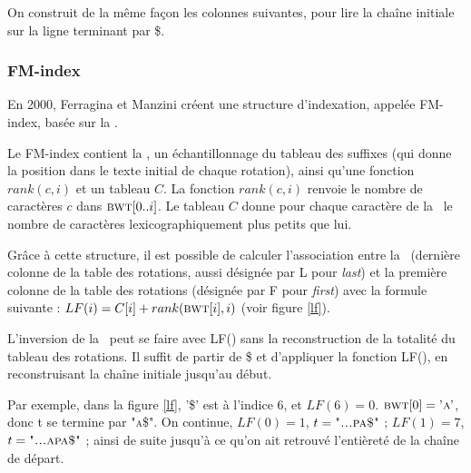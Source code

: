 On construit de la même façon les colonnes suivantes, pour lire la chaîne initiale sur la ligne terminant par \$.

\subsubsection{FM-index}

En 2000, Ferragina et Manzini créent une structure d'indexation, appelée FM-index, basée sur la \bwt.

Le FM-index contient la \bwt, un échantillonnage du tableau des suffixes (qui donne la position dans le texte initial de chaque rotation), ainsi qu'une fonction $rank(c, i)$  et un tableau $C$.
La fonction $rank(c, i)$ renvoie  le nombre de caractères $c$ dans $\textsc{bwt}[0..i]$. Le tableau $C$ donne pour chaque caractère de la \bwt\ le nombre de caractères lexicographiquement plus petits que lui.

Grâce à cette structure, il est possible de calculer l'association entre la \bwt\ (dernière colonne de la table des rotations, aussi désignée par L pour \textit{last}) et la première colonne de la table des rotations (désignée par F pour \textit{first}) avec la formule suivante : $LF(i) = C[i] + rank(\textsc{bwt}[i], i)$ (voir figure \ref{lf}).

L'inversion de la \bwt\ peut se faire avec LF() sans la reconstruction de la totalité du tableau des rotations. 
Il suffit de partir de \$ et d'appliquer la fonction LF(), en reconstruisant la chaîne initiale jusqu'au début.

Par exemple, dans la figure \ref{lf}, '\$' est à l'indice 6, et $LF(6) = 0$. $\textsc{bwt}[0] = \textsc{'a'}$, donc t se termine par \textsc{"a\$"}. On continue, $LF(0) = 1$, $t = \textsc{"...pa\$"}$ ; $LF(1) = 7$, $t = \textsc{"...apa\$"}$ ; ainsi de suite jusqu'à ce qu'on ait retrouvé l'entièreté de la chaîne de départ.


